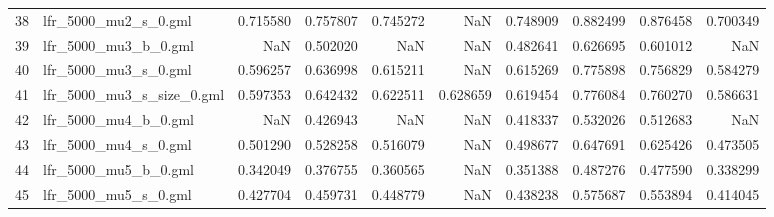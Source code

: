 \begin{tabular}{llrrrrrrrr}
38 &        lfr\_5000\_mu2\_s\_0.gml &                            0.715580 &                       0.757807 &                          0.745272 &                           NaN &                        0.748909 &                     0.882499 &                            0.876458 &                                0.700349 \\
39 &        lfr\_5000\_mu3\_b\_0.gml &                                 NaN &                       0.502020 &                               NaN &                           NaN &                        0.482641 &                     0.626695 &                            0.601012 &                                     NaN \\
40 &        lfr\_5000\_mu3\_s\_0.gml &                            0.596257 &                       0.636998 &                          0.615211 &                           NaN &                        0.615269 &                     0.775898 &                            0.756829 &                                0.584279 \\
41 &   lfr\_5000\_mu3\_s\_size\_0.gml &                            0.597353 &                       0.642432 &                          0.622511 &                      0.628659 &                        0.619454 &                     0.776084 &                            0.760270 &                                0.586631 \\
42 &        lfr\_5000\_mu4\_b\_0.gml &                                 NaN &                       0.426943 &                               NaN &                           NaN &                        0.418337 &                     0.532026 &                            0.512683 &                                     NaN \\
43 &        lfr\_5000\_mu4\_s\_0.gml &                            0.501290 &                       0.528258 &                          0.516079 &                           NaN &                        0.498677 &                     0.647691 &                            0.625426 &                                0.473505 \\
44 &        lfr\_5000\_mu5\_b\_0.gml &                            0.342049 &                       0.376755 &                          0.360565 &                           NaN &                        0.351388 &                     0.487276 &                            0.477590 &                                0.338299 \\
45 &        lfr\_5000\_mu5\_s\_0.gml &                            0.427704 &                       0.459731 &                          0.448779 &                           NaN &                        0.438238 &                     0.575687 &                            0.553894 &                                0.414045 \\

\end{tabular}
